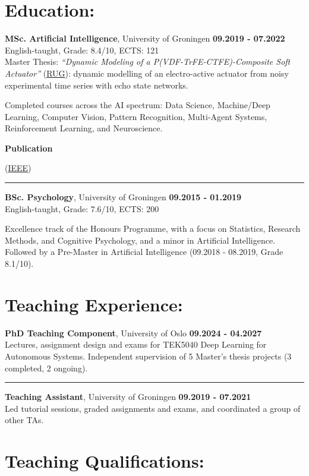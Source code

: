 \documentclass[margin]{res}
\newcommand\publication[1]{%
	\smallskip\par\hangpara{1.5em}{1}\bibentry{#1}\smallskip
}
\begin{document}
\begin{resume}
\newpage
\section{Education:}
{\bf MSc. Artificial Intelligence}, University of Groningen \hfill {\bf 09.2019 - 07.2022}   \\
English-taught,
Grade: 8.4/10,
ECTS: 121 \\
Master Thesis: \textit{``Dynamic Modeling of a P(VDF-TrFE-CTFE)-Composite Soft Actuator''} (\href{https://fse.studenttheses.ub.rug.nl/27734/}{RUG}): dynamic modelling of an electro-active actuator from noisy experimental time series with echo state networks.

Completed courses across the AI spectrum: Data Science, Machine/Deep Learning, Computer Vision, Pattern Recognition, Multi-Agent Systems, Reinforcement Learning, and Neuroscience.

\textbf{Publication}

\publication{d2022dynamic}
(\href{https://ieeexplore.ieee.org/abstract/document/9863398}{IEEE})
\vspace{0.2cm}
\hrule
{\bf BSc. Psychology}, University of Groningen \hfill {\bf 09.2015 - 01.2019}\\
English-taught, Grade: 7.6/10, ECTS: 200

Excellence track of the Honours Programme, with a focus on Statistics, Research Methods, and Cognitive Psychology, and a minor in Artificial Intelligence. Followed by a Pre-Master in Artificial Intelligence (09.2018 - 08.2019, Grade 8.1/10).

\section{Teaching Experience:}

{\bf PhD Teaching Component}, University of Oslo \hfill {\bf 09.2024 - 04.2027}   \\
Lectures, assignment design and exams for TEK5040 Deep Learning for Autonomous Systems. Independent supervision of 5 Master's thesis projects (3 completed, 2 ongoing).

\vspace{0.2cm}
\hrule
{\bf Teaching Assistant}, University of Groningen \hfill {\bf 09.2019 - 07.2021}   \\
Led tutorial sessions, graded assignments and exams, and coordinated a group of other TAs.

\section{Teaching Qualifications:}


\end{resume}
\end{document}
